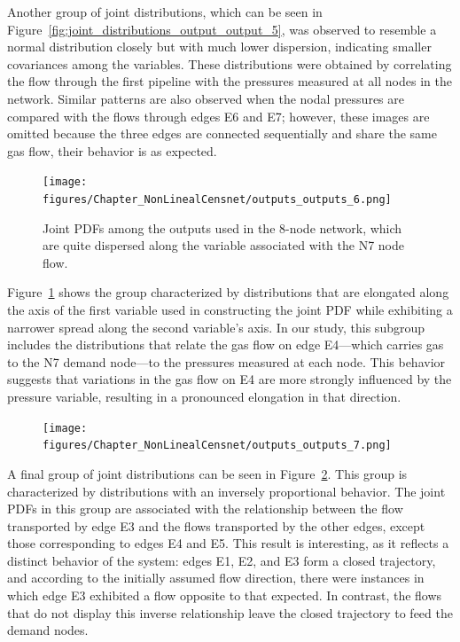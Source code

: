 Another group of joint distributions, which can be seen in Figure~\cref{fig:joint_distributions_output_output_5}, was observed to resemble a normal distribution closely but with much lower dispersion, indicating smaller covariances among the variables. These distributions were obtained by correlating the flow through the first pipeline with the pressures measured at all nodes in the network. Similar patterns are also observed when the nodal pressures are compared with the flows through edges E6 and E7; however, these images are omitted because the three edges are connected sequentially and share the same gas flow, their behavior is as expected.

\begin{figure}
    \begin{center}
        \texttt{[image: figures/Chapter\_NonLinealCensnet/outputs\_outputs\_6.png]}
    \end{center}
    \caption{Joint PDFs among the outputs used in the 8-node network, which are quite dispersed along the variable associated with the N7 node flow.}\label{fig:joint_distributions_output_output_6}
\end{figure}
 

Figure~\cref{fig:joint_distributions_output_output_6} shows the group characterized by distributions that are elongated along the axis of the first variable used in constructing the joint PDF while exhibiting a narrower spread along the second variable's axis. In our study, this subgroup includes the distributions that relate the gas flow on edge E4—which carries gas to the N7 demand node—to the pressures measured at each node. This behavior suggests that variations in the gas flow on E4 are more strongly influenced by the pressure variable, resulting in a pronounced elongation in that direction. 

\begin{figure}
    \begin{center}
        \texttt{[image: figures/Chapter\_NonLinealCensnet/outputs\_outputs\_7.png]}
    \end{center}
    \caption{}\label{fig:joint_distributions_output_output_7}
\end{figure}
 

A final group of joint distributions can be seen in Figure~\cref{fig:joint_distributions_output_output_7}. This group is characterized by distributions with an inversely proportional behavior. The joint PDFs in this group are associated with the relationship between the flow transported by edge E3 and the flows transported by the other edges, except those corresponding to edges E4 and E5. This result is interesting, as it reflects a distinct behavior of the system: edges E1, E2, and E3 form a closed trajectory, and according to the initially assumed flow direction, there were instances in which edge E3 exhibited a flow opposite to that expected. In contrast, the flows that do not display this inverse relationship leave the closed trajectory to feed the demand nodes.


